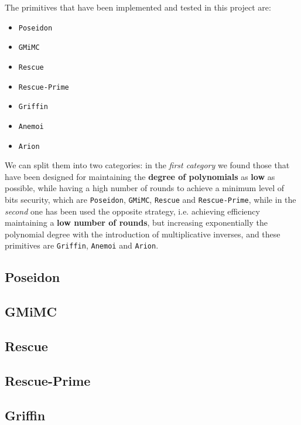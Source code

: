 \documentclass[12pt, a4paper]{report}
\begin{document}
The primitives that have been implemented and tested in this project are:
\begin{itemize}
  \item \texttt{Poseidon}
  \item \texttt{GMiMC}
  \item \texttt{Rescue}
  \item \texttt{Rescue-Prime}
  \item \texttt{Griffin}
  \item \texttt{Anemoi}
  \item \texttt{Arion}
\end{itemize}

We can split them into two categories: in the \textit{first category} we found those that have been designed for maintaining the \textbf{degree of polynomials} as \textbf{low} as possible, while having a high number of rounds to achieve a minimum level of bits security, which are \texttt{Poseidon}, \texttt{GMiMC}, \texttt{Rescue} and \texttt{Rescue-Prime}, while in the \textit{second} one has been used the opposite strategy, i.e. achieving efficiency maintaining a \textbf{low number of rounds}, but increasing exponentially the polynomial degree with the introduction of multiplicative inverses, and these primitives are \texttt{Griffin}, \texttt{Anemoi} and \texttt{Arion}.

\subsection{Poseidon}\label{subsec:poseidon}

\subsection{GMiMC}\label{subsec:gmimc}

\subsection{Rescue}\label{subsec:rescue}

\subsection{Rescue-Prime}\label{subsec:rescueprime}

\subsection{Griffin}\label{subsec:griffin}
\end{document}
